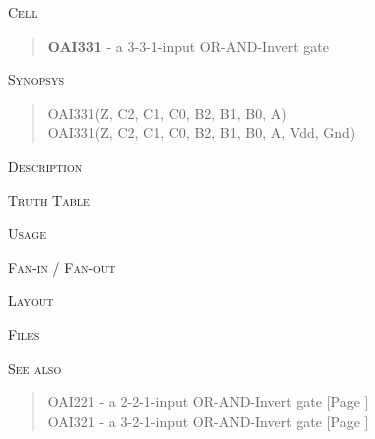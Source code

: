 
\label{OAI331}
\textsc{Cell}
\begin{quote}
    \textbf{OAI331} - a 3-3-1-input OR-AND-Invert gate
\end{quote}

\textsc{Synopsys}
\begin{quote}
    OAI331(Z, C2, C1, C0, B2, B1, B0, A) \\
    OAI331(Z, C2, C1, C0, B2, B1, B0, A, Vdd, Gnd)
\end{quote}

\textsc{Description}

%

\textsc{Truth Table}


\textsc{Usage}

\textsc{Fan-in / Fan-out}

\textsc{Layout}

\textsc{Files}

\textsc{See also}
\begin{quote}
    OAI221 - a 2-2-1-input OR-AND-Invert gate [Page \pageref{OAI221}] \\
    OAI321 - a 3-2-1-input OR-AND-Invert gate [Page \pageref{OAI321}]
\end{quote}
